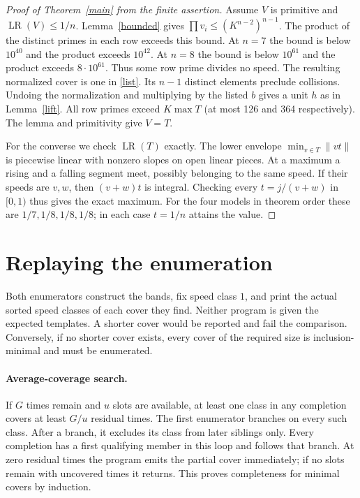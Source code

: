 \documentclass[11pt,a4paper]{article}
\newcommand{\LR}{\operatorname{LR}}
\newcommand{\nn}[1]{\lVert #1\rVert}
\begin{document}
\begin{proof}[Proof of Theorem~\ref{main} from the finite assertion]
Assume $V$ is primitive and $\LR(V)\le1/n$. Lemma~\ref{bounded} gives
$\prod v_i\le(K^{n-2})^{n-1}$. The product of the distinct primes in
each row exceeds this bound. At $n=7$ the bound is below $10^{40}$
and the product exceeds $10^{42}$. At $n=8$ the bound is below $10^{61}$
and the product exceeds $8\cdot10^{61}$. Thus some row prime divides
no speed. The resulting normalized cover is one in \eqref{list}. Its
$n-1$ distinct elements preclude collisions. Undoing the normalization
and multiplying by the listed $b$ gives a unit $h$ as in
Lemma~\ref{lift}. All row primes exceed $K\max T$ (at most 126 and 364
respectively). The lemma and primitivity give $V=T$.

For the converse we check $\LR(T)$ exactly. The lower envelope
$\min_{v\in T}\nn{vt}$ is piecewise linear with nonzero slopes on open
linear pieces. At a maximum a rising and a falling segment meet,
possibly belonging to the same speed. If their speeds are $v,w$, then
$(v+w)t$ is integral. Checking every $t=j/(v+w)$ in $[0,1)$ thus gives
the exact maximum. For the four models in theorem order these are
$1/7,1/8,1/8,1/8$; in each case $t=1/n$ attains the value.
\end{proof}

\newpage
\section{Replaying the enumeration}
Both enumerators construct the bands, fix speed class $1$, and print the
actual sorted speed classes of each cover they find. Neither program is
given the expected templates. A shorter cover would be reported and fail
the comparison. Conversely, if no shorter cover exists, every cover of
the required size is inclusion-minimal and must be enumerated.

\paragraph{Average-coverage search.}
If $G$ times remain and $u$ slots are available, at least one class in any
completion covers at least $G/u$ residual times. The first enumerator
branches on every such class. After a branch, it excludes its class from
later siblings only. Every completion has a first qualifying member in
this loop and follows that branch. At zero residual times the program
emits the partial cover immediately; if no slots remain with uncovered
times it returns. This proves completeness for minimal covers by induction.
\end{document}
